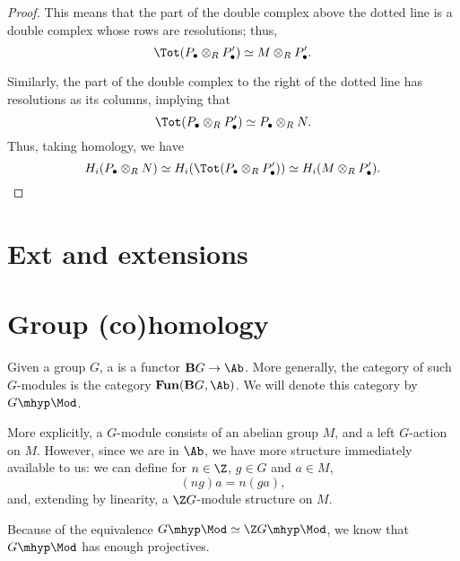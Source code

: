 \documentclass[main.tex]{subfiles}
\begin{document}
\begin{proof}
  This means that the part of the double complex above the dotted line is a double complex whose rows are resolutions; thus,
  \begin{equation*}
    \Tot(P_{\bullet} \otimes_{R} P'_{\bullet}) \simeq M \otimes_{R} P'_{\bullet}.
  \end{equation*}

  Similarly, the part of the double complex to the right of the dotted line has resolutions as its columns, implying that
  \begin{equation*}
    \Tot(P_{\bullet} \otimes_{R} P'_{\bullet}) \simeq P_{\bullet} \otimes_{R} N.
  \end{equation*}
  Thus, taking homology, we have
  \begin{equation*}
    H_{i}(P_{\bullet} \otimes_{R} N) \simeq H_{i}(\Tot(P_{\bullet} \otimes_{R} P'_{\bullet})) \simeq H_{i} (M \otimes_{R} P'_{\bullet}).
  \end{equation*}
\end{proof}


\section{Ext and extensions}
\label{sec:ext_and_extensions}

\section{Group (co)homology}
\label{sec:group_co_homology}

Given a group $G$, a  is a functor $\mathbf{B}G \to \Ab$. More generally, the category of such $G$-modules is the category $\mathbf{Fun}(\mathbf{B}G, \Ab)$. We will denote this category by $G\mhyp\Mod$.

More explicitly, a $G$-module consists of an abelian group $M$, and a left $G$-action on $M$. However, since we are in $\Ab$, we have more structure immediately available to us: we can define for $n \in \Z$, $g \in G$ and $a \in M$,
\begin{equation*}
  (ng)a = n(ga),
\end{equation*}
and, extending by linearity, a $\Z G$-module structure on $M$.

Because of the equivalence $G\mhyp\Mod \simeq \Z G\mhyp\Mod$, we know that $G\mhyp\Mod$ has enough projectives.
\end{document}
